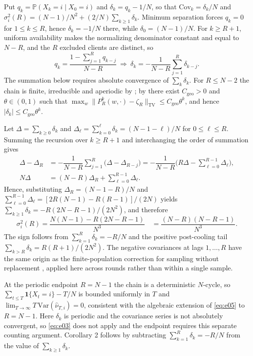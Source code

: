 \documentclass[twoside,11pt]{article}
\begin{document}
Put $q_k=\mathbb{P}(X_k=i\mid X_0=i)$ and $\delta_k=q_k-1/N$, so that $\mathrm{Cov}_k=\delta_k/N$ and $\sigma_i^{2}(R)=(N-1)/N^{2}+(2/N)\sum_{k\geq1}\delta_k$. Minimum separation forces $q_k=0$ for $1\leq k\leq R$, hence $\delta_k=-1/N$ there, while $\delta_0=(N-1)/N$. For $k\geq R+1$, uniform availability makes the normalizing denominator constant and equal to $N-R$, and the $R$ excluded clients are distinct, so
\begin{equation}\label{eq:e34}
q_k=\dfrac{1-\sum_{j=1}^{R}q_{k-j}}{N-R}\ \Longrightarrow\ \delta_k=-\dfrac{1}{N-R}\sum_{j=1}^{R}\delta_{k-j}.
\end{equation}
The summation below requires absolute convergence of $\sum_k\delta_k$. For $R\leq N-2$ the chain is finite, irreducible and aperiodic by \citep[Lemma~1]{ref1}; by \citep[Theorem~4.9]{ref24} there exist $C_{\mathrm{geo}}>0$ and $\theta\in(0,1)$ such that $\max_w\|P_R^{k}(w,\cdot)-\zeta_R\|_{\mathrm{TV}}\leq C_{\mathrm{geo}}\theta^{k}$, and hence $|\delta_k|\leq C_{\mathrm{geo}}\theta^{k}$.

Let $\Delta=\sum_{k\geq0}\delta_k$ and $\Delta_\ell=\sum_{k=0}^{\ell}\delta_k=(N-1-\ell)/N$ for $0\leq\ell\leq R$. Summing the recursion over $k\geq R+1$ and interchanging the order of summation gives
\begin{equation}\label{eq:e35}
\begin{aligned}
\Delta-\Delta_R
&=-\dfrac{1}{N-R}\sum_{j=1}^{R}\big(\Delta-\Delta_{R-j}\big)
=-\dfrac{1}{N-R}\Big(R\Delta-\sum_{\ell=0}^{R-1}\Delta_\ell\Big),\\
N\Delta&=(N-R)\Delta_R+\sum_{\ell=0}^{R-1}\Delta_\ell.
\end{aligned}
\end{equation}
Hence, substituting $\Delta_R=(N-1-R)/N$ and $\sum_{\ell=0}^{R-1}\Delta_\ell=[2R(N-1)-R(R-1)]/(2N)$ yields $\sum_{k\geq1}\delta_k=-R(2N-R-1)/(2N^{2})$, and therefore
\begin{equation}\label{eq:e36}
\sigma_i^{2}(R)=\dfrac{N(N-1)-R(2N-R-1)}{N^{3}}\quad =\dfrac{(N-R)(N-R-1)}{N^{3}}.
\end{equation}
The sign follows from $\sum_{k=1}^{R}\delta_k=-R/N$ and the positive post-cooling tail $\sum_{k>R}\delta_k=R(R+1)/(2N^{2})$. The negative covariances at lags $1,\dots,R$ have the same origin as the finite-population correction for sampling without replacement \citep[Ch.~2]{ref25}, applied here across rounds rather than within a single sample.

At the periodic endpoint $R=N-1$ the chain is a deterministic $N$-cycle, so $\sum_{t\leq T}\mathbf{1}\{X_t=i\}-T/N$ is bounded uniformly in $T$ and $\lim_{T\to\infty}T\,\mathrm{Var}(\hat\nu_{T,i})=0$, consistent with the algebraic extension of \eqref{eq:e05} to $R=N-1$. Here $\delta_k$ is periodic and the covariance series is not absolutely convergent, so \eqref{eq:e03} does not apply and the endpoint requires this separate counting argument. Corollary 2 follows by subtracting $\sum_{k=1}^{R}\delta_k=-R/N$ from the value of $\sum_{k\geq1}\delta_k$.
\end{document}
